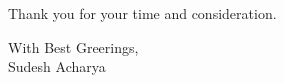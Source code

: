 \documentclass[11pt,A4]{article}
\newcommand{\mystrut}{\rule[-.3\baselineskip]{0pt}{\baselineskip}}
\begin{document}
\vspace{15pt}
Thank you for your time and consideration.

\vspace{25pt}
\begin{flushleft}
	{With Best Greerings,}\\
	\vspace{7pt}
	{Sudesh Acharya}\\
	
	
\end{flushleft}



\null
\vspace*{\fill}
\hspace{-0.25\linewidth}\colorbox{bgcol}{\makebox[1.5\linewidth][c]{\mystrut \small \textcolor{white}{TeX}}}


%
%
\end{document}
